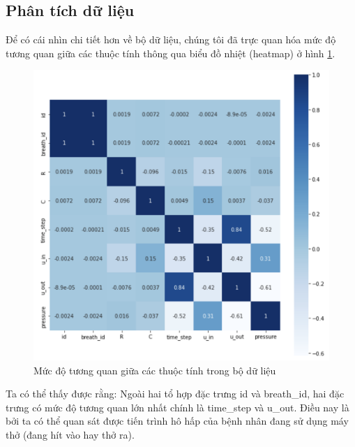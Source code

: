 \documentclass{article}
\begin{document}
\subsection{Phân tích dữ liệu}
Để có cái nhìn chi tiết hơn về bộ dữ liệu, chúng tôi đã trực quan hóa mức độ tương quan giữa các thuộc tính thông qua biểu đồ nhiệt (heatmap) ở hình \ref{fig:correlation}.
\begin{figure}[!h]
    \centering
    \includegraphics[scale=0.4]{correlation.png}
    \caption{Mức độ tương quan giữa các thuộc tính trong bộ dữ liệu}
    \label{fig:correlation}
\end{figure}

Ta có thể thấy được rằng: Ngoài hai tổ hợp đặc trưng id và breath\_id, hai đặc trưng có mức độ tương quan lớn nhất chính là time\_step và u\_out. Điều nay là bởi ta có thể quan sát được tiến trình hô hấp của bệnh nhân đang sử dụng máy thở (đang hít vào hay thở ra). 
\end{document}
